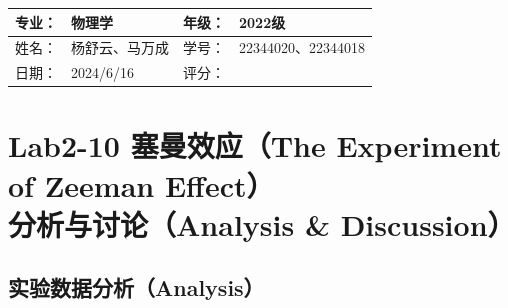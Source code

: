 \documentclass[dvipsnames, svgnames,a4paper,11pt]{article}
\begin{document}
	
	
	\clearpage
	
	\begin{table}
		\renewcommand\arraystretch{1.7}
		\begin{tabularx}{\textwidth}{|X|X|X|X|}
			\hline
			专业：& 物理学 &年级：& 2022级\\
			\hline
			姓名： & 杨舒云、马万成 & 学号：& 22344020、22344018\\
			\hline
			日期：& 2024/6/16 & 评分： &\\
			\hline
		\end{tabularx}
	\end{table}
	
	\section{Lab2-10 塞曼效应（The Experiment of Zeeman Effect）\\ \quad\heiti 分析与讨论（Analysis \& Discussion）}
	
	\subsection{实验数据分析（Analysis）}
	
\end{document}
